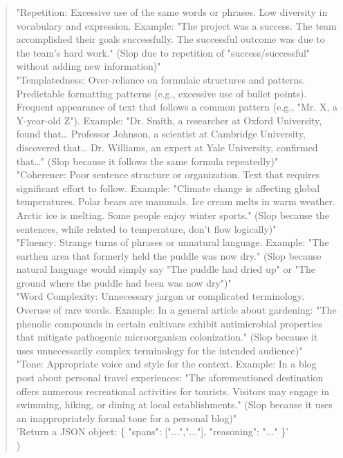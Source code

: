 \documentclass{article} %
\begin{document}
\begin{quote}
{\hspace*{1em}"Repetition: Excessive use of the same words or phrases. Low diversity in vocabulary and expression. Example: "The project was a success. The team accomplished their goals successfully. The successful outcome was due to the team's hard work." (Slop due to repetition of "success/successful" without adding new information)"\\
\hspace*{1em}"Templatedness: Over-reliance on formulaic structures and patterns. Predictable formatting patterns (e.g., excessive use of bullet points). Frequent appearance of text that follows a common pattern (e.g., "Mr. X, a Y-year-old Z"). Example: "Dr. Smith, a researcher at Oxford University, found that… Professor Johnson, a scientist at Cambridge University, discovered that… Dr. Williams, an expert at Yale University, confirmed that…" (Slop because it follows the same formula repeatedly)"\\
\hspace*{1em}"Coherence: Poor sentence structure or organization. Text that requires significant effort to follow. Example: "Climate change is affecting global temperatures. Polar bears are mammals. Ice cream melts in warm weather. Arctic ice is melting. Some people enjoy winter sports." (Slop because the sentences, while related to temperature, don't flow logically)"\\
\hspace*{1em}"Fluency: Strange turns of phrases or unnatural language. Example: "The earthen area that formerly held the puddle was now dry." (Slop because natural language would simply say "The puddle had dried up" or "The ground where the puddle had been was now dry")"\\
\hspace*{1em}"Word Complexity: Unnecessary jargon or complicated terminology. Overuse of rare words. Example: In a general article about gardening: "The phenolic compounds in certain cultivars exhibit antimicrobial properties that mitigate pathogenic microorganism colonization." (Slop because it uses unnecessarily complex terminology for the intended audience)"\\
\hspace*{1em}"Tone: Appropriate voice and style for the context. Example: In a blog post about personal travel experiences: "The aforementioned destination offers numerous recreational activities for tourists. Visitors may engage in swimming, hiking, or dining at local establishments." (Slop because it uses an inappropriately formal tone for a personal blog)"\\
\hspace*{1em}'Return a JSON object: \{ "spans": ["...","..."], "reasoning": "..." \}'\\
)}


\end{quote}
\end{document}
